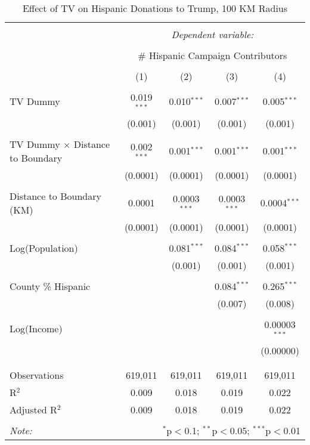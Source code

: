 
\begin{table}[!htbp] \centering 
  \caption{Effect of TV on Hispanic Donations to Trump, 100 KM Radius} 
  \label{} 
\begin{tabular}{@{\extracolsep{-5pt}}lcccc} 
\\[-1.8ex]\hline 
\hline \\[-1.8ex] 
 & \multicolumn{4}{c}{\textit{Dependent variable:}} \\ 
\cline{2-5} 
\\[-1.8ex] & \multicolumn{4}{c}{\# Hispanic Campaign Contributors} \\ 
\\[-1.8ex] & (1) & (2) & (3) & (4)\\ 
\hline \\[-1.8ex] 
 TV Dummy & 0.019$^{***}$ & 0.010$^{***}$ & 0.007$^{***}$ & 0.005$^{***}$ \\ 
  & (0.001) & (0.001) & (0.001) & (0.001) \\ 
  & & & & \\ 
 TV Dummy $\times$ Distance to Boundary  & 0.002$^{***}$ & 0.001$^{***}$ & 0.001$^{***}$ & 0.001$^{***}$ \\ 
  & (0.0001) & (0.0001) & (0.0001) & (0.0001) \\ 
  & & & & \\ 
 Distance to Boundary (KM) & 0.0001 & 0.0003$^{***}$ & 0.0003$^{***}$ & 0.0004$^{***}$ \\ 
  & (0.0001) & (0.0001) & (0.0001) & (0.0001) \\ 
  & & & & \\ 
 Log(Population) &  & 0.081$^{***}$ & 0.084$^{***}$ & 0.058$^{***}$ \\ 
  &  & (0.001) & (0.001) & (0.001) \\ 
  & & & & \\ 
 County \% Hispanic &  &  & 0.084$^{***}$ & 0.265$^{***}$ \\ 
  &  &  & (0.007) & (0.008) \\ 
  & & & & \\ 
 Log(Income) &  &  &  & 0.00003$^{***}$ \\ 
  &  &  &  & (0.00000) \\ 
  & & & & \\ 
\hline \\[-1.8ex] 
Observations & 619,011 & 619,011 & 619,011 & 619,011 \\ 
R$^{2}$ & 0.009 & 0.018 & 0.019 & 0.022 \\ 
Adjusted R$^{2}$ & 0.009 & 0.018 & 0.019 & 0.022 \\ 
\hline 
\hline \\[-1.8ex] 
\textit{Note:}  & \multicolumn{4}{r}{$^{*}$p$<$0.1; $^{**}$p$<$0.05; $^{***}$p$<$0.01} \\ 
\end{tabular} 
\end{table} 
